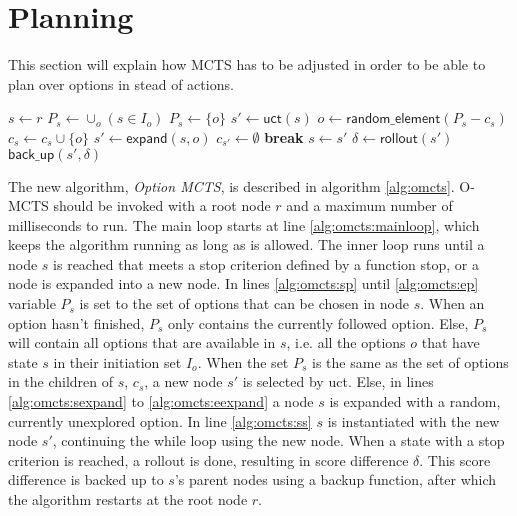 \section{Planning}
\label{sec:planning}
This section will explain how MCTS has to be adjusted in order to be able to
plan over options in stead of actions.

\begin{algorithm}
	\caption{$\mathsf{O-MCTS}(r, max\_time)$}
	\label{alg:omcts}
	\begin{algorithmic}[1]
		 \label{alg:omcts:mainloop}
			\State $s \gets r$
			 \label{alg:omcts:innerloop}
				 \label{alg:omcts:sp}
					\State $P_s \gets \cup_o ( s \in I_o)$
				\Else
					\State $P_s \gets \{o\}$ %
				\EndIf \label{alg:omcts:ep}
					\State $s' \gets \mathsf{uct}(s)$ \label{alg:omcts:uct}
				\Else \label{alg:omcts:sexpand}
					\State $o \gets \mathsf{random\_element}(P_s - c_s)$ 
					\State $c_s \gets c_s \cup \{o\}$
					\State $s' \gets \mathsf{expand}(s, o)$
					\State $c_{s'} \gets \emptyset$
					\State \textbf{break} \label{alg:omcts:break}
				\EndIf \label{alg:omcts:eexpand}
				\State $s \gets s'$ \label{alg:omcts:ss}
			\EndWhile
			\State $\delta \gets \mathsf{rollout}(s')$ \label{alg:omcts:rollout}
			\State $\mathsf{back\_up}(s', \delta)$ \label{alg:omcts:backup}
		\EndWhile
	\end{algorithmic}
\end{algorithm}

The new algorithm, \emph{Option MCTS}, is described in algorithm
\ref{alg:omcts}. O-MCTS should be invoked with a root node $r$ and a maximum
number of milliseconds to run. The main loop starts at line
\ref{alg:omcts:mainloop}, which keeps the algorithm running as long as is
allowed. The inner loop runs until a node $s$ is reached that meets a stop
criterion defined by a function \textsf{stop}, or a node is expanded into a new
node. In lines \ref{alg:omcts:sp} until \ref{alg:omcts:ep} variable $P_s$ is set
to the set of options that can be chosen in node $s$. When an option hasn't
finished, $P_s$ only contains the currently followed option. Else, $P_s$ will
contain all options that are available in $s$, i.e. all the options $o$ that
have state $s$ in their initiation set $I_o$. When the set $P_s$ is the same as
the set of options in the children of $s$, $c_s$, a new node $s'$ is selected by
\textsf{uct}. Else, in lines \ref{alg:omcts:sexpand} to \ref{alg:omcts:eexpand}
a node $s$ is expanded with a random, currently unexplored option. In line
\ref{alg:omcts:ss} $s$ is instantiated with the new node $s'$, continuing the
while loop using the new node. When a state with a stop criterion is reached, a
rollout is done, resulting in score difference $\delta$. This score difference
is backed up to $s$'s parent nodes using a backup function, after which the
algorithm restarts at the root node $r$.

